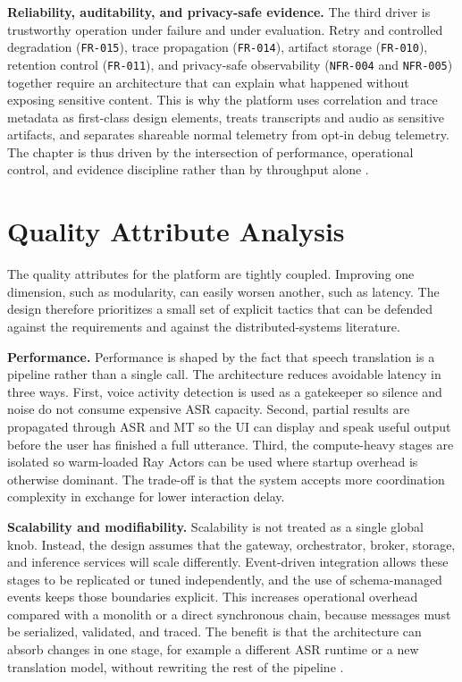 \textbf{Reliability, auditability, and privacy-safe evidence.} The third driver is trustworthy operation under failure and under evaluation. Retry and controlled degradation (\texttt{FR-015}), trace propagation (\texttt{FR-014}), artifact storage (\texttt{FR-010}), retention control (\texttt{FR-011}), and privacy-safe observability (\texttt{NFR-004} and \texttt{NFR-005}) together require an architecture that can explain what happened without exposing sensitive content. This is why the platform uses correlation and trace metadata as first-class design elements, treats transcripts and audio as sensitive artifacts, and separates shareable normal telemetry from opt-in debug telemetry. The chapter is thus driven by the intersection of performance, operational control, and evidence discipline rather than by throughput alone \cite{bass2023engineeringai,xu2025scalability}.

\section{Quality Attribute Analysis}
\label{sec:quality_attributes}

The quality attributes for the platform are tightly coupled. Improving one dimension, such as modularity, can easily worsen another, such as latency. The design therefore prioritizes a small set of explicit tactics that can be defended against the requirements and against the distributed-systems literature.

\textbf{Performance.} Performance is shaped by the fact that speech translation is a pipeline rather than a single call. The architecture reduces avoidable latency in three ways. First, voice activity detection is used as a gatekeeper so silence and noise do not consume expensive ASR capacity. Second, partial results are propagated through ASR and MT so the UI can display and speak useful output before the user has finished a full utterance. Third, the compute-heavy stages are isolated so warm-loaded Ray Actors can be used where startup overhead is otherwise dominant. The trade-off is that the system accepts more coordination complexity in exchange for lower interaction delay.

\textbf{Scalability and modifiability.} Scalability is not treated as a single global knob. Instead, the design assumes that the gateway, orchestrator, broker, storage, and inference services will scale differently. Event-driven integration allows these stages to be replicated or tuned independently, and the use of schema-managed events keeps those boundaries explicit. This increases operational overhead compared with a monolith or a direct synchronous chain, because messages must be serialized, validated, and traced. The benefit is that the architecture can absorb changes in one stage, for example a different ASR runtime or a new translation model, without rewriting the rest of the pipeline \cite{kleppmann2017designing,newman2019monolith,richardson2018microservices}.

